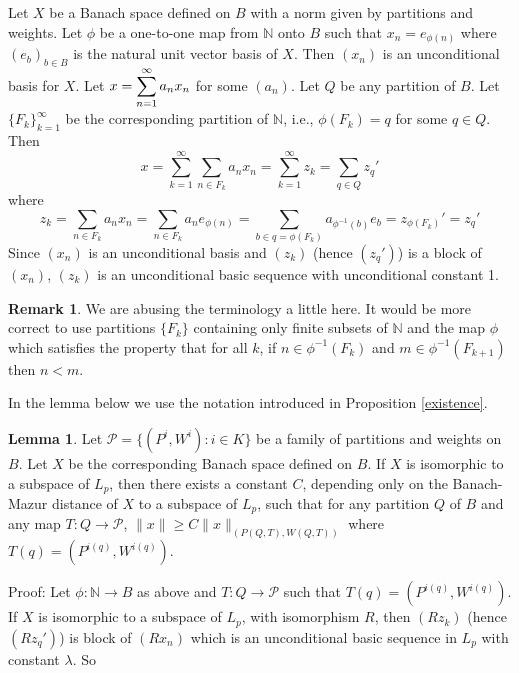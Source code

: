 \documentclass[12pt]{amsart}
\theoremstyle{definition}
\newtheorem{lemma}[theorem]{Lemma}
\newtheorem{remark}[theorem]{Remark}
\theoremstyle{remark}
\numberwithin{equation}{section}
\begin{document}
Let $X$ be a Banach space defined on $B$ with a norm given 
by partitions and weights. Let $\phi$ be a one-to-one map 
from $\mathbb{N}$ onto $B$ such that  $x_n=e_{\phi(n)}$
where $(e_b)_{b\in B}$ is the natural unit vector basis of $X$.
Then $(x_n)$ is an unconditional basis for $X$. Let
$\begin{displaystyle}x=\sum_{n=1}^{\infty} a_n x_n\end{displaystyle}$ 
for some $(a_n)$.
Let $Q$ be any partition of $B$.  Let $\{F_k\}_{k=1}^{\infty}$
be the corresponding partition of $\mathbb{N}$, i.e., $\phi(F_k)=q$
for some $q\in Q$. Then
$$ x=\sum_{k=1}^{\infty}\sum_{n\in F_k} a_n x_n
 = \sum_{k=1}^{\infty} z_k 
= \sum_{q\in Q} z_{q}'
$$
where 
$$
z_k = \sum_{n\in F_k} a_nx_n=\sum_{n\in F_k} a_ne_{\phi(n)}
=\sum_{b\in q=\phi(F_k)} a_{\phi^{-1}(b)}e_b=z_{\phi(F_k)}'=z_{q}'
$$
Since $(x_n)$ is an unconditional basis and $(z_k)$ (hence $(z_{q}')$) 
is a block of $(x_n)$, $(z_k)$ is an unconditional basic sequence
with unconditional constant 1.
\begin{remark}
We are abusing the terminology a little here. It would be more correct to
use partitions $\{F_k\}$
containing only finite subsets of $\mathbb N$ and the
map $\phi$ which satisfies the property that for all $k$,
if $n \in \phi^{-1}(F_k)$ and $m\in
\phi^{-1}(F_{k+1})$ then $n<m$.
\end{remark}

In the lemma below we use the notation introduced in Proposition 
\ref{existence}.

\begin{lemma}\label{lower estimate}
Let ${\mathcal{P}}=\{(P^i, W^i): i\in K\}$ be a family of 
partitions and weights on $B$. 
Let $X$ be the corresponding Banach space defined on $B$. 
 If $X$ is isomorphic to a subspace of $L_p$, then there exists 
a constant $C$, depending only on the Banach-Mazur distance of $X$ to a
 subspace of $L_p$, such that for any partition $Q$ of $B$ and
 any map $T: Q\rightarrow \mathcal{P}$, $\|x\|\ge C\|x\|_{(P(Q,T),W(Q,T))}$
 where $T(q)=(P^{i(q)}, W^{i(q)})$.
\end{lemma}

Proof: Let $\phi: {\mathbb{N}} \rightarrow B $ as above and 
$T: Q \rightarrow \mathcal{P}$ such that $T(q)=(P^{i(q)}, W^{i(q)})$.
 If $X$ is isomorphic to a subspace of $L_p$, with isomorphism
 $R$, then $(Rz_k)$ (hence $(Rz_{q}')$) is block of $(Rx_n)$
 which is an unconditional basic sequence in $L_p$ with constant
 $\lambda$. So 
\end{document}
